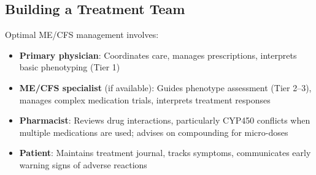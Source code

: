 \subsection{Building a Treatment Team}

Optimal ME/CFS management involves:
\begin{itemize}
    \item \textbf{Primary physician}: Coordinates care, manages prescriptions, interprets basic phenotyping (Tier 1)
    \item \textbf{ME/CFS specialist} (if available): Guides phenotype assessment (Tier 2--3), manages complex medication trials, interprets treatment responses
    \item \textbf{Pharmacist}: Reviews drug interactions, particularly CYP450 conflicts when multiple medications are used; advises on compounding for micro-doses
    \item \textbf{Patient}: Maintains treatment journal, tracks symptoms, communicates early warning signs of adverse reactions
\end{itemize}

